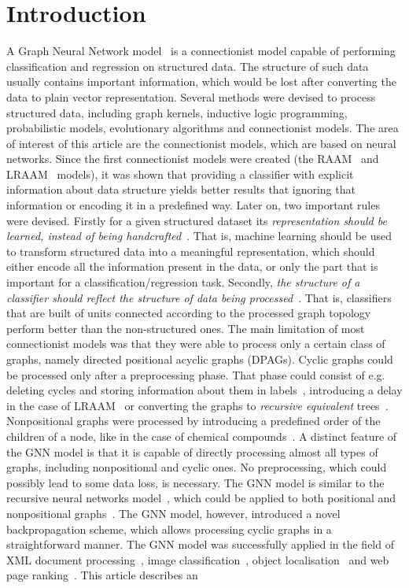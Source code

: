 \documentclass[]{spie}  %
\begin{document}
\section{Introduction}
A Graph Neural Network model~\cite{scarselli2009graph} is a connectionist model capable of performing classification and regression on structured data. The structure of such data usually contains important information, which would be lost after converting the data to plain vector representation. Several methods were devised to process structured data, including graph kernels, inductive logic programming, probabilistic models, evolutionary algorithms and connectionist models. The area of interest of this article are the connectionist models, which are based on neural networks. Since the first connectionist models were created (the RAAM~\cite{pollack1990recursive} and LRAAM~\cite{sperduti1994labelling} models), it was shown that providing a classifier with explicit information about data structure yields better results that ignoring that information or encoding it in a predefined way. Later on, two important rules were devised. Firstly for a given structured dataset its \emph{representation should be learned, instead of being handcrafted}~\cite{goulon2005hopfield}. That is, machine learning should be used to transform structured data into a meaningful representation, which should either encode all the information present in the data, or only the part that is important for a classification/regression task. Secondly, \emph{the structure of a classifier should reflect the structure of data being processed}~\cite{goulon2005hopfield}. That is, classifiers that are built of units connected according to the processed graph topology perform better than the non-structured ones. The main limitation of most connectionist models was that they were able to process only a certain class of graphs, namely directed positional acyclic graphs (DPAGs). Cyclic graphs could be processed only after a preprocessing phase. That phase could consist of e.g. deleting cycles and storing information about them in labels~\cite{goulon2005learning},  introducing a delay in the case of LRAAM~\cite{goulon2005hopfield} or converting the graphs to \emph{recursive equivalent} trees~\cite{bianchini2003backpropagation}. Nonpositional graphs were processed by introducing a predefined order of the children of a node, like in the case of chemical compounds~\cite{ivanciuc2003canonical}. A distinct feature of the GNN model is that it is capable of directly processing almost all types of graphs, including nonpositional and cyclic ones. No preprocessing, which could possibly lead to some data loss, is necessary. The GNN model is similar to the recursive neural networks model~\cite{frasconi1998general}, which could be applied to both positional and nonpositional graphs~\cite{bianchini2005recursive}. The GNN model, however, introduced a novel backpropagation scheme, which allows processing cyclic graphs in a straightforward manner. The GNN model was successfully applied in the field of XML document processing~\cite{yong2006xml}, image classification~\cite{quek2011structural}, object localisation~\cite{monfardini2006graph} and web page ranking~\cite{scarselli2005graph}. This article describes an 
\end{document}
